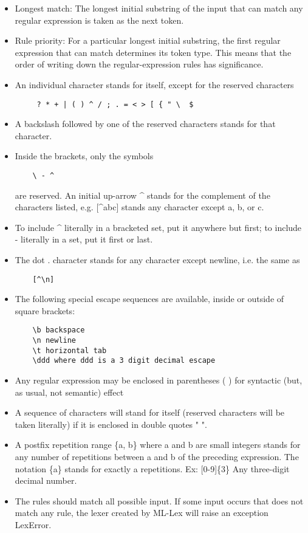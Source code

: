 \begin{itemize}
  \item Longest match: The longest initial substring of the input that can match any regular expression is taken as the next token.
  \item Rule priority: For a particular longest initial substring, the first regular expression that can match determines its token type. This means that the order of writing down the regular-expression rules has significance.
  \item An individual character stands for itself, except for the reserved characters 
    \begin{verbatim}
     ? * + | ( ) ^ / ; . = < > [ { " \  $
    \end{verbatim}
  \item A backslash followed by one of the reserved characters stands for that character. 
  \item Inside the brackets, only the symbols 
  \begin{verbatim} 
    \ - ^ 
  \end{verbatim}
    are reserved. An initial up-arrow \^{} stands for the complement of the characters listed, e.g. [\^{}abc] stands any character except a, b, or c.
  \item  To include \^{} literally in a bracketed set, put it anywhere but first; to include - literally in a set, put it first or last. 
  \item The dot . character stands for any character except newline, i.e. the same as 
  \begin{verbatim}
    [^\n]
  \end{verbatim}
  \item The following special escape sequences are available, inside or outside of square brackets: 
    \begin{verbatim}
    \b backspace
    \n newline
    \t horizontal tab
    \ddd where ddd is a 3 digit decimal escape
    \end{verbatim}
    \item Any regular expression may be enclosed in parentheses ( ) for syntactic (but, as
    usual, not semantic) effect
    \item A sequence of characters will stand for itself (reserved characters will be taken literally) if it is enclosed in double quotes " ".
    \item A postfix repetition range \{a, b\} where a and b are small integers stands for any number of repetitions between a and b of the preceding expression. The notation \{a\} stands for exactly a repetitions. Ex: [0-9]\{3\}
    Any three-digit decimal number. 
    \item The rules should match all possible input. If some input occurs that does not match any rule, the lexer created by ML-Lex will raise an exception LexError.
\end{itemize}

